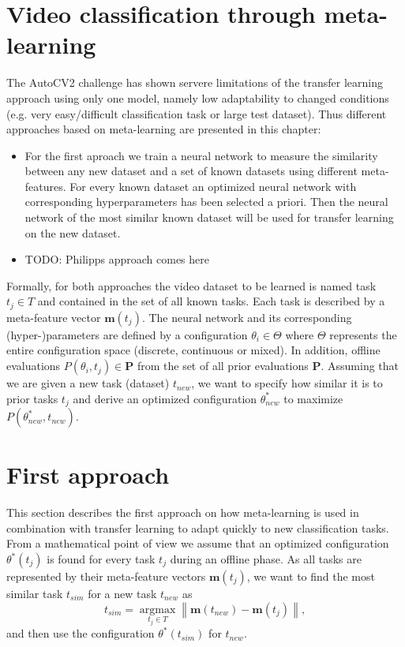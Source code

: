 \documentclass{article}
\begin{document}
\section{Video classification through meta-learning}
\label{sec:ml}

The AutoCV2 challenge has shown servere limitations of the transfer learning approach using only one model, namely low adaptability to changed conditions (e.g. very easy/difficult classification task or large test dataset). Thus different approaches based on meta-learning are presented in this chapter:
%
\begin{itemize}
\item For the first aproach we train a neural network to measure the similarity between any new dataset and a set of known datasets using different meta-features. For every known dataset an optimized neural network with corresponding hyperparameters has been selected a priori. Then the neural network of the most similar known dataset will be used for transfer learning on the new dataset.
\item TODO: Philipps approach comes here
\end{itemize} 
%
Formally, for both approaches the video dataset to be learned is named task $t_j \in T$ and contained in the set of all known tasks. Each task is described by a meta-feature vector $\mathbf{m}(t_j)$. The neural network and its corresponding (hyper-)parameters are defined by a configuration $\theta_i \in \Theta$ where $\Theta$ represents the entire configuration space (discrete, continuous or mixed). In addition, offline evaluations $P(\theta_i, t_j) \in \mathbf{P}$ from the set of all prior evaluations $\mathbf{P}$. Assuming that we are given a new task (dataset) $t_{new}$, we want to specify how similar it is to prior tasks $t_j$ and derive an optimized configuration $\theta^*_{new}$ to maximize $P(\theta^*_{new}, t_{new})$.

\section{First approach}
\label{sec:firstapproach}

This section describes the first approach on how meta-learning is used in combination with transfer learning to adapt quickly to new classification tasks. From a mathematical point of view we assume that an optimized configuration $\theta^*(t_j)$ is found for every task $t_j$ during an offline phase. As all tasks are represented by their meta-feature vectors $\mathbf{m}(t_j)$, we want to find the most similar task $t_{sim}$ for a new task $t_{new}$ as 
%
\begin{equation}
t_{sim} = \underset{t_j \in T}{\operatorname{argmax}}  \left\|\mathbf{m}(t_{new}) - \mathbf{m}(t_j)\right\|, 
\label{eq:tsim}
\end{equation}
%
and then use the configuration $\theta^*(t_{sim})$ for $t_{new}$. 
\end{document}
